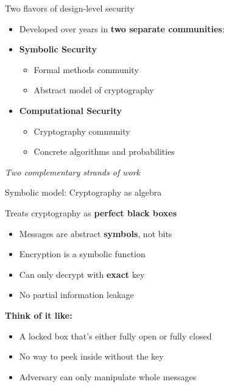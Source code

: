 \documentclass[aspectratio=169, lualatex, handout]{beamer}
\begin{document}
\begin{frame}{Two flavors of design-level security}
	\begin{itemize}
		\item Developed over years in \textbf{two separate communities}:
		      \vspace{0.5em}
		\item \textbf{Symbolic Security}
		      \begin{itemize}
			      \item Formal methods community
			      \item Abstract model of cryptography
		      \end{itemize}
		      \vspace{0.5em}
		\item \textbf{Computational Security}
		      \begin{itemize}
			      \item Cryptography community
			      \item Concrete algorithms and probabilities
		      \end{itemize}
	\end{itemize}
	\begin{center}
		\textit{Two complementary strands of work}
	\end{center}
\end{frame}

\begin{frame}{Symbolic model: Cryptography as algebra}
	\begin{center}
		\Large
		Treats cryptography as \textbf{perfect black boxes}
	\end{center}
	\vspace{1em}
	\begin{itemize}
		\item Messages are abstract \textbf{symbols}, not bits
		\item Encryption is a symbolic function
		\item Can only decrypt with \textbf{exact} key
		\item No partial information leakage
	\end{itemize}
	\vspace{0.5em}
	\textbf{Think of it like:}
	\begin{itemize}
		\item A locked box that's either fully open or fully closed
		\item No way to peek inside without the key
		\item Adversary can only manipulate whole messages
	\end{itemize}
\end{frame}
\end{document}
